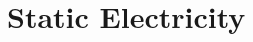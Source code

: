 \documentclass[../main.tex]{subfiles}
\begin{document}
	\section{Static Electricity}	
\end{document}
